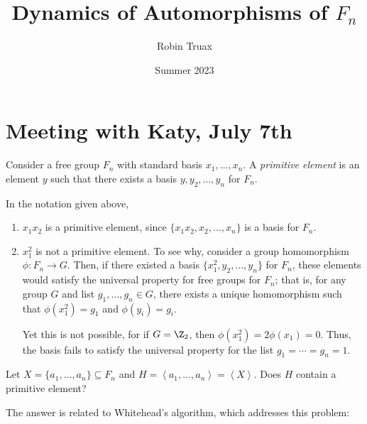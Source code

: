 \documentclass[12pt]{article}
\title{Dynamics of Automorphisms of $F_n$}
\author{Robin Truax}
\date{Summer 2023}
\begin{document}
\maketitle
\tableofcontents

\section{Meeting with Katy, July 7th}

\begin{definition}\label{def:Primitive_Elements}
    Consider a free group $F_n$ with standard basis $x_1, \ldots, x_n$. A \emph{primitive element} is an element $y$ such that there exists a basis $y, y_2, \ldots, y_n$ for $F_n$. 
\end{definition}

\begin{example}\label{exam:Examples_of_Primitive_Elements}
    In the notation given above,\\

    \begin{enumerate}
        \itemsep1em
        \item $x_1x_2$ is a primitive element, since $\{x_1x_2, x_2, \ldots, x_n\}$ is a basis for $F_n$.
        \item $x_1^2$ is not a primitive element. To see why, consider a group homomorphism $\phi: F_n \rightarrow G$. Then, if there existed a basis $\{x_1^2, y_2, \ldots, y_n\}$ for $F_n$, these elements would satisfy the universal property for free groups for $F_n$; that is, for any group $G$ and list $g_1,\ldots,g_n \in G$, there exists a unique homomorphism such that $\phi(x_1^2) = g_1$ and $\phi(y_i) = g_i$. 

            Yet this is not possible, for if $G = \Z_2$, then $\phi(x_1^2) = 2\phi(x_1) = 0$. Thus, the basis fails to satisfy the universal property for the list $g_1 = \cdots = g_n = 1$.
    \end{enumerate}
\end{example}

\begin{problem}\label{prob:Classifying_Primitive_Elements}
    Let $X = \{a_1, \ldots, a_n\} \subseteq F_n$ and $H = \left<a_1, \ldots, a_n\right> = \left<X\right>$. Does $H$ contain a primitive element?
\end{problem}

The answer is related to Whitehead's algorithm, which addresses this problem: 
\end{document}
